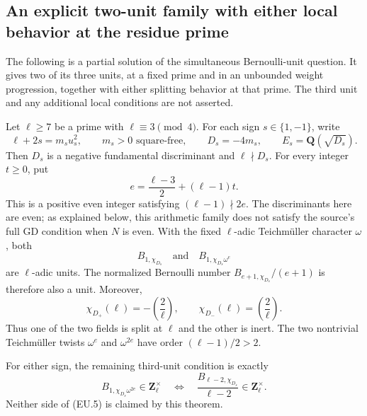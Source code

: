 \subsection{An explicit two-unit family with either local behavior at the residue prime}
\label{sec:kt-explicit-two-unit}

The following is a partial solution of the simultaneous Bernoulli-unit
question.  It gives two of its three units, at a fixed prime and in an
unbounded weight progression, together with either splitting behavior at
that prime.  The third unit and any additional local conditions are not
asserted.

\begin{theorem}
Let $\ell\geq7$ be a prime with $\ell\equiv3\pmod4$.  For each sign
$s\in\{1,-1\}$, write
\[
 \ell+2s=m_su_s^2,\qquad m_s>0\text{ square-free},\qquad
 D_s=-4m_s,\qquad E_s=\mathbf Q(\sqrt{D_s}).                 \tag{EU.1}
\]
Then $D_s$ is a negative fundamental discriminant and $\ell\nmid D_s$.
For every integer $t\geq0$, put
\[
 e=\frac{\ell-3}{2}+(\ell-1)t.                              \tag{EU.2}
\]
This is a positive even integer satisfying $(\ell-1)\nmid2e$.
The discriminants here are even; as explained below, this arithmetic
family does not satisfy the source's full GD condition when $N$ is even.
With the fixed $\ell$-adic Teichm\"uller character $\omega$, both
\[
 B_{1,\chi_{D_s}}\quad\text{and}\quad
 B_{1,\chi_{D_s}\omega^e}
                                                               \tag{EU.3}
\]
are $\ell$-adic units.  The normalized Bernoulli number
$B_{e+1,\chi_{D_s}}/(e+1)$ is therefore also a unit.
Moreover,
\[
 \chi_{D_+}(\ell)=-\left(\frac2\ell\right),\qquad
 \chi_{D_-}(\ell)= \left(\frac2\ell\right).                 \tag{EU.4}
\]
Thus one of the two fields is split at $\ell$ and the other is inert.
The two nontrivial Teichm\"uller twists $\omega^e$ and $\omega^{2e}$
have order $(\ell-1)/2>2$.

For either sign, the remaining third-unit condition is exactly
\[
 B_{1,\chi_{D_s}\omega^{2e}}\in\mathbf Z_\ell^\times
 \quad\Longleftrightarrow\quad
 \frac{B_{\ell-2,\chi_{D_s}}}{\ell-2}\in\mathbf Z_\ell^\times.
                                                               \tag{EU.5}
\]
Neither side of (EU.5) is claimed by this theorem.
\end{theorem}

